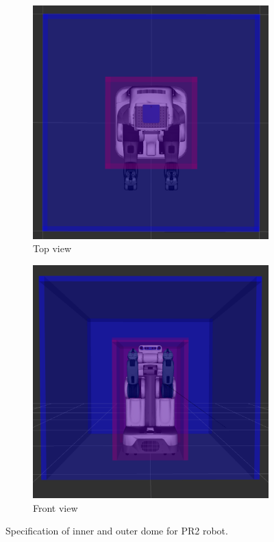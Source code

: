 \documentclass[a4paper]{report}
\begin{document}
\begin{figure}[H]
    \centering
    \begin{subfigure}{0.48\textwidth}
        \includegraphics[width=\textwidth]{domes_top}
        \caption{Top view}
        \label{fig:domes_top}
    \end{subfigure} 
    \begin{subfigure}{0.48\textwidth}
        \includegraphics[width=\textwidth]{domes_front}
        \caption{Front view}
        \label{fig:domes_front}
    \end{subfigure}
    \caption{
    Specification of inner and outer dome for PR2 robot.
    }
\label{fig:domes}
\end{figure}
\end{document}
